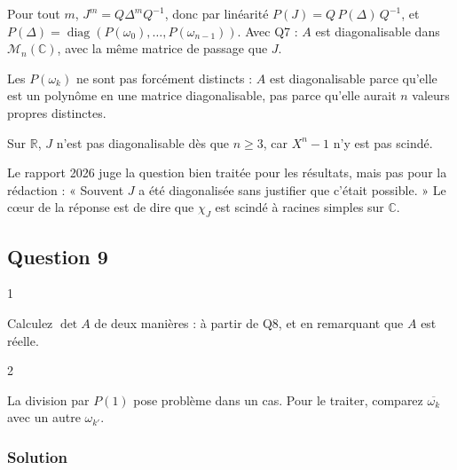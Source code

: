 \documentclass[11pt,a4paper]{article}
\newcommand{\equationajustee}[1]{%
  \sbox{\boiteequation}{$\displaystyle #1$}%
  \ifdim\wd\boiteequation>\linewidth
    \[\resizebox{\linewidth}{!}{\usebox{\boiteequation}}\]%
  \else
    \[#1\]%
  \fi}
\begin{document}
Pour tout \(m\), \(J^m=Q\Delta^mQ^{-1}\), donc par linéarité \(P(J)=Q\,P(\Delta)\,Q^{-1}\), et \(P(\Delta)=\operatorname{diag}(P(\omega_0),\allowbreak \dots,\allowbreak P(\omega_{n-1}))\). Avec Q7 :
\equationajustee{\boxed{A=Q\,\operatorname{diag}\bigl(P(\omega_0),P(\omega_1),\dots,P(\omega_{n-1})\bigr)\,Q^{-1}.}}
\(A\) est diagonalisable dans \(\mathcal M_n(\mathbb C)\), avec la même matrice de passage que \(J\).

\begin{piege}

Les \(P(\omega_k)\) ne sont pas forcément distincts : \(A\) est diagonalisable parce qu'elle est un polynôme en une matrice diagonalisable, pas parce qu'elle aurait \(n\) valeurs propres distinctes.

Sur \(\mathbb R\), \(J\) n'est pas diagonalisable dès que \(n\ge3\), car \(X^n-1\) n'y est pas scindé.

\end{piege}

\begin{jury}

Le rapport 2026 juge la question bien traitée pour les résultats, mais pas pour la rédaction : « Souvent \(J\) a été diagonalisée sans justifier que c'était possible. » Le cœur de la réponse est de dire que \(\chi_J\) est scindé à racines simples sur \(\mathbb C\).

\end{jury}

\hypertarget{question-9}{%
\subsection{Question 9}\label{question-9}}

\begin{indication}{1}

Calculez \(\det A\) de deux manières : à partir de Q8, et en remarquant que \(A\) est réelle.

\end{indication}

\begin{indication}{2}

La division par \(P(1)\) pose problème dans un cas. Pour le traiter, comparez \(\overline{\omega_k}\) avec un autre \(\omega_{k'}\).

\end{indication}

\hypertarget{solution-8}{%
\subsubsection{Solution}\label{solution-8}}
\end{document}
